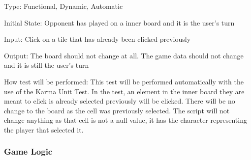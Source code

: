 \documentclass[12pt, titlepage]{article}
\begin{document}
\begin{enumerate}
Type: Functional, Dynamic, Automatic
					
Initial State: Opponent has played on a inner board and it is the user's turn
					
Input: Click on a tile that has already been clicked previously
					
Output: The board should not change at all. The game data should not change
and it is still the user's turn
					
How test will be performed: This test will be performed automatically with the
use of the Karma Unit Test. In the test, an element in the inner board they
are meant to click is already selected previously will be clicked. There will
be no change to the board as the cell was previously selected. The script will
not change anything as that cell is not a null value, it has the character
representing the player that selected it.

\end{enumerate}

\subsubsection{Game Logic}
\end{document}
